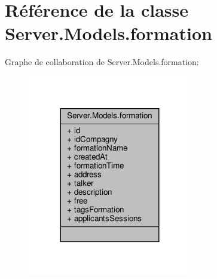 \hypertarget{class_server_1_1_models_1_1formation}{}\section{Référence de la classe Server.\+Models.\+formation}
\label{class_server_1_1_models_1_1formation}


Graphe de collaboration de Server.\+Models.\+formation\+:\nopagebreak
\begin{figure}[H]
\begin{center}
\leavevmode
\includegraphics[width=203pt]{class_server_1_1_models_1_1formation__coll__graph}
\end{center}
\end{figure}
